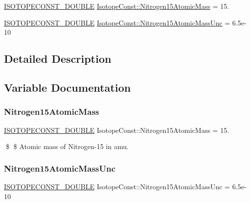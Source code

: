 \begin{DoxyCompactItemize}
\item 
\mbox{\hyperlink{group___isotope_const-_macros_ga8f45a7272ce02c0b4c65c44636ed719a}{I\+S\+O\+T\+O\+P\+E\+C\+O\+N\+S\+T\+\_\+\+D\+O\+U\+B\+LE}} \mbox{\hyperlink{group___isotope_const-_nitrogen-_n15_ga97cb1e2e2aded2cbfbb306b67dd9f3a1}{Isotope\+Const\+::\+Nitrogen15\+Atomic\+Mass}} = 15.
\item 
\mbox{\hyperlink{group___isotope_const-_macros_ga8f45a7272ce02c0b4c65c44636ed719a}{I\+S\+O\+T\+O\+P\+E\+C\+O\+N\+S\+T\+\_\+\+D\+O\+U\+B\+LE}} \mbox{\hyperlink{group___isotope_const-_nitrogen-_n15_ga3b8fcf26849bda739b0a64807a39040a}{Isotope\+Const\+::\+Nitrogen15\+Atomic\+Mass\+Unc}} = 6.\+5e-\/10
\end{DoxyCompactItemize}


\subsection{Detailed Description}


\subsection{Variable Documentation}
\mbox{\label{group___isotope_const-_nitrogen-_n15_ga97cb1e2e2aded2cbfbb306b67dd9f3a1}} 
\subsubsection{\texorpdfstring{Nitrogen15\+Atomic\+Mass}{Nitrogen15AtomicMass}}
{\footnotesize\ttfamily \mbox{\hyperlink{group___isotope_const-_macros_ga8f45a7272ce02c0b4c65c44636ed719a}{I\+S\+O\+T\+O\+P\+E\+C\+O\+N\+S\+T\+\_\+\+D\+O\+U\+B\+LE}} Isotope\+Const\+::\+Nitrogen15\+Atomic\+Mass = 15.}

\$ \$ Atomic mass of Nitrogen-\/15 in amu. \mbox{\label{group___isotope_const-_nitrogen-_n15_ga3b8fcf26849bda739b0a64807a39040a}} 
\subsubsection{\texorpdfstring{Nitrogen15\+Atomic\+Mass\+Unc}{Nitrogen15AtomicMassUnc}}
{\footnotesize\ttfamily \mbox{\hyperlink{group___isotope_const-_macros_ga8f45a7272ce02c0b4c65c44636ed719a}{I\+S\+O\+T\+O\+P\+E\+C\+O\+N\+S\+T\+\_\+\+D\+O\+U\+B\+LE}} Isotope\+Const\+::\+Nitrogen15\+Atomic\+Mass\+Unc = 6.\+5e-\/10}

